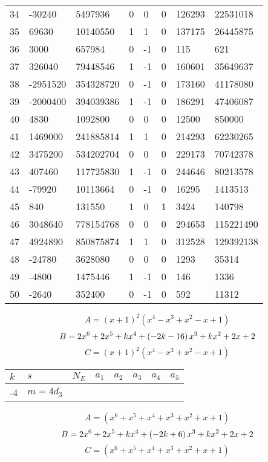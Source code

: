 \documentclass{amsart}
\begin{document}
\begin{longtable}{|l|l|l|lllll|}
34&-30240&5497936&0&0&0&126293&22531018\\
35&69630&10140550&1&1&0&137175&26445875\\
36&3000&657984&0&-1&0&115&621\\
37&326040&79448546&1&-1&0&160601&35649637\\
38&-2951520&354328720&0&-1&0&173160&41178080\\
39&-2000400&394039386&1&-1&0&186291&47406087\\
40&4830&1092800&0&0&0&12500&850000\\
41&1469000&241885814&1&1&0&214293&62230265\\
42&3475200&534202704&0&0&0&229173&70742378\\
43&407460&117725830&1&-1&0&244646&80213578\\
44&-79920&10113664&0&-1&0&16295&1413513\\
45&840&131550&1&0&1&3424&140798\\
46&3048640&778154768&0&0&0&294653&115221490\\
47&4924890&850875874&1&1&0&312528&129392138\\
48&-24780&3628080&0&0&0&1293&35314\\
49&-4800&1475446&1&-1&0&146&1336\\
50&-2640&352400&0&-1&0&592&11312\\
\hline
\end{longtable}
$$A=(x
 + 1)^{2}(x^4
 - x^3
 + x^2
 - x
 + 1)$$
$$B=2\*x^6
 + 2\*x^5
 + k\*x^4
 + \left(-2\*k
 - 16\right) \*x^3
 + k\*x^2
 + 2\*x
 + 2$$
$$C=(x
 + 1)^{2}(x^4
 - x^3
 + x^2
 - x
 + 1)$$
\begin{longtable}{|l|l|l|lllll|}
\hline
$k$ & $s$ & $N_E$ & $a_1$ & $a_2$ & $a_3$ & $a_4$ & $a_5$\\
\hline
-4&$m=4d_{3}$&&\multicolumn{5}{c|}{}\\
\hline
\end{longtable}
$$A=(x^6
 + x^5
 + x^4
 + x^3
 + x^2
 + x
 + 1)$$
$$B=2\*x^6
 + 2\*x^5
 + k\*x^4
 + \left(-2\*k
 + 6\right) \*x^3
 + k\*x^2
 + 2\*x
 + 2$$
$$C=(x^6
 + x^5
 + x^4
 + x^3
 + x^2
 + x
 + 1)$$
\end{document}
